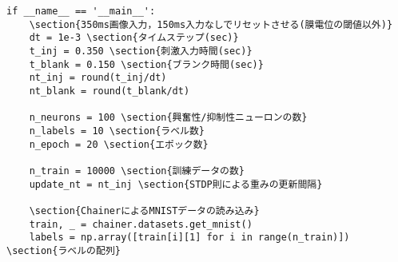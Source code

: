 \begin{verbatim}
if __name__ == '__main__':
    \section{350ms画像入力，150ms入力なしでリセットさせる(膜電位の閾値以外)}
    dt = 1e-3 \section{タイムステップ(sec)}
    t_inj = 0.350 \section{刺激入力時間(sec)}
    t_blank = 0.150 \section{ブランク時間(sec)}
    nt_inj = round(t_inj/dt)
    nt_blank = round(t_blank/dt)
    
    n_neurons = 100 \section{興奮性/抑制性ニューロンの数}
    n_labels = 10 \section{ラベル数}
    n_epoch = 20 \section{エポック数}
    
    n_train = 10000 \section{訓練データの数}
    update_nt = nt_inj \section{STDP則による重みの更新間隔}
    
    \section{ChainerによるMNISTデータの読み込み}
    train, _ = chainer.datasets.get_mnist()
    labels = np.array([train[i][1] for i in range(n_train)]) \section{ラベルの配列}
    

\end{verbatim}
